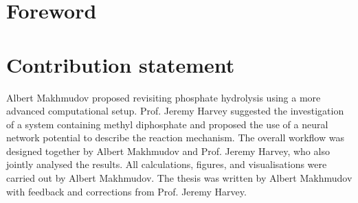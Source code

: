\chapter*{Foreword}  

\chapter*{Contribution statement}
Albert Makhmudov proposed revisiting phosphate hydrolysis using a more advanced computational setup. Prof. Jeremy Harvey suggested the investigation of a system containing methyl diphosphate and proposed the use of a neural network potential to describe the reaction mechanism. The overall workflow was designed together by Albert Makhmudov and Prof. Jeremy Harvey, who also jointly analysed the results. All calculations, figures, and visualisations were carried out by Albert Makhmudov. The thesis was written by Albert Makhmudov with feedback and corrections from Prof. Jeremy Harvey.
